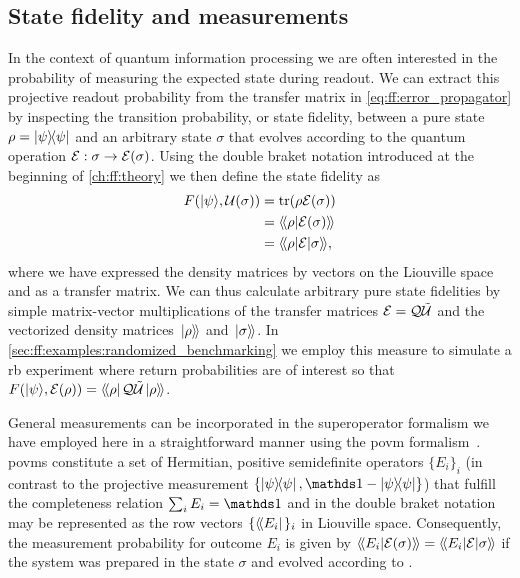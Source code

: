 \subsection{State fidelity and measurements}\label{subsec:ff:theory:derived_quantities:state_fidelity-measurements}
In the context of quantum information processing we are often interested in the probability of measuring the expected state during readout.
We can extract this projective readout probability from the transfer matrix in \cref{eq:ff:error_propagator} by inspecting the transition probability, or state fidelity, between a pure state $\rho = \op{\psi}$ and an arbitrary state $\sigma$ that evolves according to the quantum operation $\mathcal{E}: \sigma\rightarrow\mathcal{E}(\sigma)$.
Using the double braket notation introduced at the beginning of \cref{ch:ff:theory} we then define the state fidelity as
\begin{equation}\label{eq:ff:fidelity:state}
\begin{split}
    \fid(\kpsi, \liouvU(\sigma)) &= \tr(\rho\qp(\sigma)) \\
    &= \dip{\rho}{\qp(\sigma)} \\
    & =  \dmel{\rho}{\qp}{\sigma},
\end{split}
\end{equation}
where we have expressed the density matrices by vectors on the Liouville space \Lspace and \qp as a transfer matrix.
We can thus calculate arbitrary pure state fidelities by simple matrix-vector multiplications of the transfer matrices $\mathcal{E} = \mathcal{Q}\mathcal{\tilde{U}}$ and the vectorized density matrices $\mbox{\ensuremath{\left.\ket{\rho}\!\right\rangle}}$ and $\mbox{\ensuremath{\left.\ket{\sigma}\!\right\rangle}}$.
In \cref{sec:ff:examples:randomized_benchmarking} we employ this measure to simulate a \gls{rb} experiment where return probabilities are of interest so that $F(\mbox{\ensuremath{\ket{\psi}}}, \mathcal{E}(\rho)) = \mbox{\ensuremath{\left\langle\!\bra{\rho}\right.}}\mathcal{Q}\mathcal{\tilde{U}}\mbox{\ensuremath{\left.\ket{\rho}\!\right\rangle}}$.

General measurements can be incorporated in the superoperator formalism we have employed here in a straightforward manner using the \gls{povm} formalism~\cite{Wallman2014,Greenbaum2015}.
\Glspl{povm} constitute a set of Hermitian, positive semidefinite operators $\lbrace E_i\rbrace_i$ (in contrast to the projective measurement $\lbrace\op{\psi}{\psi},\eye - \op{\psi}{\psi}\rbrace$) that fulfill the completeness relation $\sum_i E_i = \eye$ and in the double braket notation may be represented as the row vectors $\lbrace\mbox{\ensuremath{\left\langle\!\bra{E_i}\right.}}\rbrace_i$ in Liouville space.
Consequently, the measurement probability for outcome $E_i$ is given by $\dip{E_i}{\qp(\sigma)} = \dmel{E_i}{\qp}{\sigma}$ if the system was prepared in the state $\sigma$ and evolved according to \qp.

